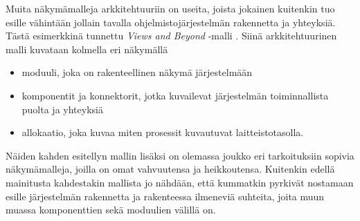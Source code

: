 \documentclass[finnish]{tktltiki2}
\numberwithin{table}{section}
\theoremstyle{definition}
\theoremstyle{remark}
\begin{document}

Muita näkymämalleja arkkitehtuuriin on useita, joista jokainen kuitenkin tuo esille vähintään jollain tavalla ohjelmistojärjestelmän rakennetta ja yhteyksiä. Tästä esimerkkinä tunnettu \textit{Views and Beyond} -malli \citep{Clements:2002:DSA:599933}. Siinä arkkitehtuurinen malli kuvataan kolmella eri näkymällä

\begin{itemize}
	\item moduuli, joka on rakenteellinen näkymä järjestelmään
	\item komponentit ja konnektorit, jotka kuvailevat järjestelmän toiminnallista puolta ja yhteyksiä
	\item allokaatio, joka kuvaa miten prosessit kuvautuvat laitteistotasolla.
\end{itemize}


Näiden kahden esitellyn mallin lisäksi on olemassa joukko eri tarkoituksiin sopivia näkymämalleja, joilla on omat vahvuutensa ja heikkoutensa. Kuitenkin edellä mainitusta kahdestakin mallista jo nähdään, että kummatkin pyrkivät nostamaan esille järjestelmän rakennetta ja rakenteessa ilmeneviä suhteita, joita muun muassa komponenttien sekä moduulien välillä on.
\end{document}
